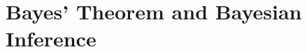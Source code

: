 \chapter{Bayes' Theorem and Bayesian Inference}\label{ch:05}

\providecommand{\FiveAMedJointD}{}\renewcommand{\FiveAMedJointD}{0.0095}
\providecommand{\FiveAMedJointH}{}\renewcommand{\FiveAMedJointH}{0.099}
\providecommand{\FiveAMedPpos}{}\renewcommand{\FiveAMedPpos}{0.1085}
\providecommand{\FiveAMedPost}{}\renewcommand{\FiveAMedPost}{0.08756}
\providecommand{\FiveAMontyPE}{}\renewcommand{\FiveAMontyPE}{0.5}
\providecommand{\FiveAMontyPostA}{}\renewcommand{\FiveAMontyPostA}{0.3333}
\providecommand{\FiveAMontyPostB}{}\renewcommand{\FiveAMontyPostB}{0.6667}
\providecommand{\FiveATrigJointS}{}\renewcommand{\FiveATrigJointS}{0.045}
\providecommand{\FiveATrigJointB}{}\renewcommand{\FiveATrigJointB}{0.019}
\providecommand{\FiveATrigPE}{}\renewcommand{\FiveATrigPE}{0.064}
\providecommand{\FiveATrigPost}{}\renewcommand{\FiveATrigPost}{0.7031}
\providecommand{\FiveABallPa}{}\renewcommand{\FiveABallPa}{0.1118}
\providecommand{\FiveABallPb}{}\renewcommand{\FiveABallPb}{0.5578}
\providecommand{\FiveABallPc}{}\renewcommand{\FiveABallPc}{0.311}
\providecommand{\FiveABallPd}{}\renewcommand{\FiveABallPd}{0.01937}
\providecommand{\FiveABallLRbc}{}\renewcommand{\FiveABallLRbc}{1.794}
\providecommand{\FiveAGrbPriorG}{}\renewcommand{\FiveAGrbPriorG}{0.3846}
\providecommand{\FiveAGrbPriorB}{}\renewcommand{\FiveAGrbPriorB}{0.1026}
\providecommand{\FiveAGrbPriorD}{}\renewcommand{\FiveAGrbPriorD}{0.5128}
\providecommand{\FiveAGrbSigOne}{}\renewcommand{\FiveAGrbSigOne}{0.4595}
\providecommand{\FiveAGrbLG}{}\renewcommand{\FiveAGrbLG}{0.004776}
\providecommand{\FiveAGrbLB}{}\renewcommand{\FiveAGrbLB}{0.004006}
\providecommand{\FiveAGrbLD}{}\renewcommand{\FiveAGrbLD}{6.629\times10^{-5}}
\providecommand{\FiveAGrbMaG}{}\renewcommand{\FiveAGrbMaG}{0.8051}
\providecommand{\FiveAGrbMaB}{}\renewcommand{\FiveAGrbMaB}{0.18}
\providecommand{\FiveAGrbMaD}{}\renewcommand{\FiveAGrbMaD}{0.0149}
\providecommand{\FiveAGrbMbG}{}\renewcommand{\FiveAGrbMbG}{0.4088}
\providecommand{\FiveAGrbMbB}{}\renewcommand{\FiveAGrbMbB}{0.04486}
\providecommand{\FiveAGrbMbD}{}\renewcommand{\FiveAGrbMbD}{0.5463}
\providecommand{\FiveAGrbForgotG}{}\renewcommand{\FiveAGrbForgotG}{0.9011}
\providecommand{\FiveAGrbForgotB}{}\renewcommand{\FiveAGrbForgotB}{0.09887}
\providecommand{\FiveAGrbNphot}{}\renewcommand{\FiveAGrbNphot}{68}
\providecommand{\FiveAGrbNtrue}{}\renewcommand{\FiveAGrbNtrue}{25}
\providecommand{\FiveAGrbNest}{}\renewcommand{\FiveAGrbNest}{23.65}
